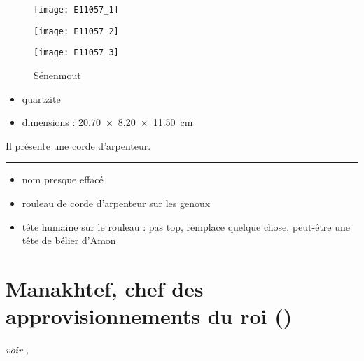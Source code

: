\documentclass[dvipsnames,a4paper,twoside,10pt,openany,article]{memoir}
\newcommand{\separation}{%
  {\noi\hspace*{\fill}\rule{.33\textwidth}{1pt}\hspace*{\fill}}%
}
\begin{document}
\begin{figure}
  \noi\begin{minipage}[b]{0.33\textwidth}%
    \centerfloat
    \texttt{[image: E11057\_1]}
  \end{minipage}%
  \hfill%
  \begin{minipage}[b]{0.33\textwidth}%
    \centerfloat
    \texttt{[image: E11057\_2]}
  \end{minipage}%
  \hfill%
  \begin{minipage}[b]{0.33\textwidth}%
    \centerfloat
    \texttt{[image: E11057\_3]}
  \end{minipage}%
  \caption{Sénenmout }%
  \label{fig:E11057}%
\end{figure}

\begin{itemize}
  \item quartzite
  \item dimensions : \SI{20.70x8.20x11.50}{\cm}
\end{itemize}

Il présente une corde d'arpenteur.

\separation

\begin{itemize}
  \item nom presque effacé
  \item rouleau de corde d'arpenteur sur les genoux
  \item tête humaine sur le rouleau : pas top, remplace quelque chose, 
        peut-être une tête de bélier d'Amon
\end{itemize}


\chapter{Manakhtef, chef des approvisionnements du roi 
         ()}
\label{sec:E12926}

\puceb{} \emph{voir , }
\bigskip
\end{document}
